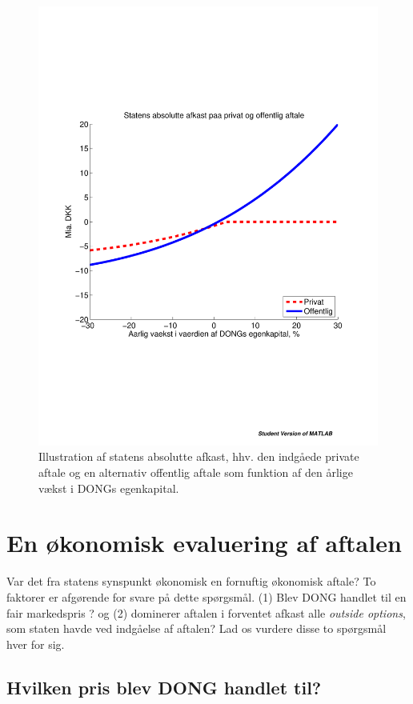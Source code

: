 \documentclass{article}
\begin{document}
\begin{figure}
\includegraphics[scale=0.8]{../matlab/figs/private_public_deal}
\caption{Illustration af statens absolutte afkast, hhv. den indg\aa{}ede private aftale og en alternativ offentlig aftale som funktion af den \aa{}rlige v\ae{}kst i DONGs egenkapital. }
\label{fig:privat_off}
\end{figure}


\section{En økonomisk evaluering af aftalen}

Var det fra statens synspunkt økonomisk en fornuftig økonomisk aftale? To faktorer er afgørende for svare på dette spørgsmål. (1) Blev DONG handlet til en fair markedspris ? og (2) dominerer aftalen i forventet afkast  alle \emph{outside options}, som staten havde ved indgåelse af aftalen? Lad os vurdere disse to spørgsmål hver for sig.

\subsection{Hvilken pris blev DONG handlet til?}
\end{document}
